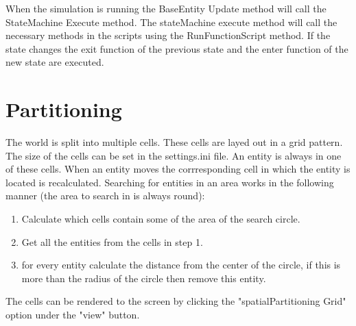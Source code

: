 \documentclass{article}
\begin{document}
   When the simulation is running the BaseEntity Update method will call the StateMachine Execute method. The stateMachine execute method will call the necessary methods in the scripts using the RunFunctionScript method. If the state changes the exit function of the previous state and the enter function of the new state are executed.
   
   \newpage
   \section {Partitioning}
   The world is split into multiple cells. These cells are layed out in a grid pattern. The size of the cells can be set in the settings.ini file. An entity is always in one of these cells. When an entity moves the corrresponding cell in which the entity is located is recalculated. Searching for entities in an area works in the following manner (the area to search in is always round):
   \begin{enumerate}
   \item Calculate which cells contain some of the area of the search circle.
   \item Get all the entities from the cells in step 1.
   \item for every entity calculate the distance from the center of the circle, if this is more than the radius of the circle then remove this entity.
   \end{enumerate}
   The cells can be rendered to the screen by clicking the "spatialPartitioning Grid" option under the "view" button. 
\newpage
 
\end{document}
